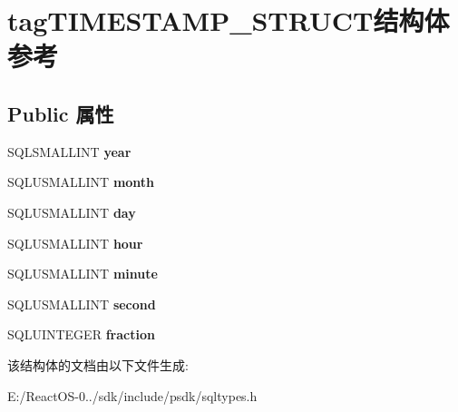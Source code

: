 \hypertarget{structtag_t_i_m_e_s_t_a_m_p___s_t_r_u_c_t}{}\section{tag\+T\+I\+M\+E\+S\+T\+A\+M\+P\+\_\+\+S\+T\+R\+U\+C\+T结构体 参考}
\label{structtag_t_i_m_e_s_t_a_m_p___s_t_r_u_c_t}
\subsection*{Public 属性}
\begin{DoxyCompactItemize}
\item 
\mbox{\label{structtag_t_i_m_e_s_t_a_m_p___s_t_r_u_c_t_a7565a23a1773c193b182ef67f629c42b}} 
S\+Q\+L\+S\+M\+A\+L\+L\+I\+NT {\bfseries year}
\item 
\mbox{\label{structtag_t_i_m_e_s_t_a_m_p___s_t_r_u_c_t_a78d7bfa41c83d4c8aa5dd36e014d0300}} 
S\+Q\+L\+U\+S\+M\+A\+L\+L\+I\+NT {\bfseries month}
\item 
\mbox{\label{structtag_t_i_m_e_s_t_a_m_p___s_t_r_u_c_t_a7e77d7a1cc9251bec9316eae9a87ed12}} 
S\+Q\+L\+U\+S\+M\+A\+L\+L\+I\+NT {\bfseries day}
\item 
\mbox{\label{structtag_t_i_m_e_s_t_a_m_p___s_t_r_u_c_t_a055e6055679f7cff6fb0405d08866f09}} 
S\+Q\+L\+U\+S\+M\+A\+L\+L\+I\+NT {\bfseries hour}
\item 
\mbox{\label{structtag_t_i_m_e_s_t_a_m_p___s_t_r_u_c_t_ab2754122a8564f411c74a914c196ebe3}} 
S\+Q\+L\+U\+S\+M\+A\+L\+L\+I\+NT {\bfseries minute}
\item 
\mbox{\label{structtag_t_i_m_e_s_t_a_m_p___s_t_r_u_c_t_a60445e510a3a1aaf4ef47aa68879d95f}} 
S\+Q\+L\+U\+S\+M\+A\+L\+L\+I\+NT {\bfseries second}
\item 
\mbox{\label{structtag_t_i_m_e_s_t_a_m_p___s_t_r_u_c_t_a151f3315aef5ba0ee5defa95593a5c13}} 
S\+Q\+L\+U\+I\+N\+T\+E\+G\+ER {\bfseries fraction}
\end{DoxyCompactItemize}


该结构体的文档由以下文件生成\+:\begin{DoxyCompactItemize}
\item 
E\+:/\+React\+O\+S-\/0../sdk/include/psdk/sqltypes.\+h\end{DoxyCompactItemize}
